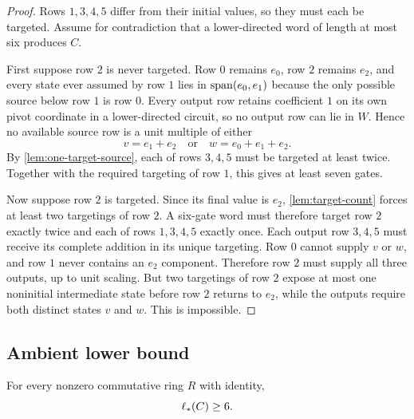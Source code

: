 \begin{proof}
Rows $1,3,4,5$ differ from their initial values, so they must each be targeted.  Assume for contradiction that a lower-directed word of length at most six produces $C$.

First suppose row $2$ is never targeted.  Row $0$ remains $e_0$, row $2$ remains $e_2$, and every state ever assumed by row $1$ lies in $\operatorname{span}(e_0,e_1)$ because the only possible source below row $1$ is row $0$.  Every output row retains coefficient $1$ on its own pivot coordinate in a lower-directed circuit, so no output row can lie in $W$.  Hence no available source row is a unit multiple of either
\[
v=e_1+e_2
\quad\text{or}\quad
w=e_0+e_1+e_2.
\]
By \cref{lem:one-target-source}, each of rows $3,4,5$ must be targeted at least twice.  Together with the required targeting of row $1$, this gives at least seven gates.

Now suppose row $2$ is targeted.  Since its final value is $e_2$, \cref{lem:target-count} forces at least two targetings of row $2$.  A six-gate word must therefore target row $2$ exactly twice and each of rows $1,3,4,5$ exactly once.  Each output row $3,4,5$ must receive its complete addition in its unique targeting.  Row $0$ cannot supply $v$ or $w$, and row $1$ never contains an $e_2$ component.  Therefore row $2$ must supply all three outputs, up to unit scaling.  But two targetings of row $2$ expose at most one noninitial intermediate state before row $2$ returns to $e_2$, while the outputs require both distinct states $v$ and $w$.  This is impossible.
\end{proof}

\subsection{Ambient lower bound}

\begin{proposition}\label{prop:ambient-lower-bound}
For every nonzero commutative ring $R$ with identity,
\[
\ell_{*}(C)\ge6.
\]
\end{proposition}

